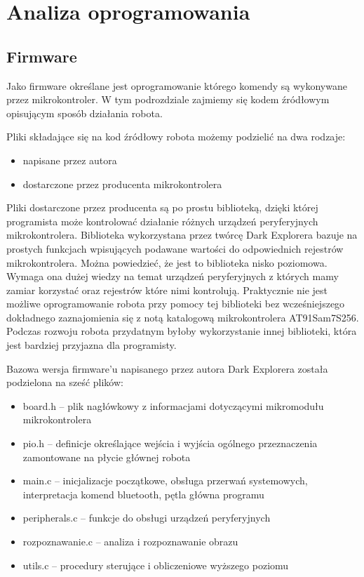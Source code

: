 \section{Analiza oprogramowania}
\subsection{Firmware}
Jako firmware określane jest oprogramowanie którego komendy są wykonywane przez mikrokontroler. W tym podrozdziale zajmiemy się kodem źródłowym opisującym sposób działania robota.

Pliki składające się na kod źródłowy robota możemy podzielić na dwa rodzaje:
\begin{itemize}
 \item napisane przez autora
 \item dostarczone przez producenta mikrokontrolera
\end{itemize}

Pliki dostarczone przez producenta są po prostu biblioteką, dzięki której programista może kontrolować działanie różnych urządzeń peryferyjnych mikrokontrolera. Biblioteka wykorzystana przez twórcę Dark Explorera bazuje na prostych funkcjach wpisujących podawane wartości do odpowiednich rejestrów mikrokontrolera. Można powiedzieć, że jest to biblioteka nisko poziomowa. Wymaga ona dużej wiedzy na temat urządzeń peryferyjnych z których mamy zamiar korzystać oraz rejestrów które nimi kontrolują. Praktycznie nie jest możliwe oprogramowanie robota przy pomocy tej biblioteki bez wcześniejszego dokładnego zaznajomienia się z notą katalogową mikrokontrolera AT91Sam7S256. Podczas rozwoju robota przydatnym byłoby wykorzystanie innej biblioteki, która jest bardziej przyjazna dla programisty.

Bazowa wersja firmware'u napisanego przez autora Dark Explorera została podzielona na sześć plików:
\begin{itemize}
 \item board.h -- plik nagłówkowy z informacjami dotyczącymi mikromodułu mikrokontrolera
 \item pio.h -- definicje określające wejścia i wyjścia ogólnego przeznaczenia zamontowane na płycie głównej robota
 \item main.c -- inicjalizacje początkowe, obsługa przerwań systemowych, interpretacja komend bluetooth, pętla główna programu
 \item peripherals.c -- funkcje do obsługi urządzeń peryferyjnych
 \item rozpoznawanie.c -- analiza i rozpoznawanie obrazu
 \item utils.c -- procedury sterujące i obliczeniowe wyższego poziomu
\end{itemize}

